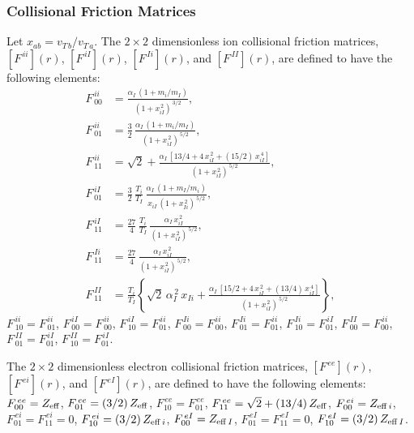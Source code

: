 \documentclass[12pt,prb,aps]{revtex4-1}
\begin{document}
\subsubsection{Collisional Friction Matrices}
Let $x_{ab}=v_{T\,b}/v_{T\,a}$. The  $2\times 2$ dimensionless ion collisional friction matrices, $[F^{\,ii}](r)$, $[F^{\,iI}](r)$, $[F^{\,Ii}](r)$, and $[F^{\,II}](r)$, are defined to have the following elements:\,\cite{sigmar}
\begin{align}
F^{\,ii}_{\,00} &= \frac{\alpha_I\,(1+m_i/m_I)}{(1+x_{iI}^{\,2})^{\,3/2}},\\[0.5ex]
F^{\,ii}_{\,01}&=\frac{3}{2}\,\frac{\alpha_I\,(1+m_i/m_I)}{(1+x_{iI}^{\,2})^{\,5/2}},\\[0.5ex]
F^{\,ii}_{\,11}& =\sqrt{2}+ \frac{\alpha_I\,[13/4+4\,x_{iI}^{\,2}+(15/2)\,x_{iI}^{\,4}]}{(1+x_{iI}^{\,2})^{\,5/2}},\\[0.5ex]
F^{\,iI}_{\,01}&=\frac{3}{2}\,\frac{T_i}{T_I}\,\frac{\alpha_I\,(1+m_I/m_i)}{x_{iI}\,(1+x_{Ii}^{\,2})^{\,5/2}},\\[0.5ex]
F^{\,iI}_{\,11}& =\frac{27}{4}\,\frac{T_i}{T_I}\,\frac{\alpha_I\,x_{iI}^{\,2}}{(1+x_{iI}^{\,2})^{\,5/2}},\\[0.5ex]
F^{\,Ii}_{\,11}& =\frac{27}{4}\,\frac{\alpha_I\,x_{iI}^{\,2}}{(1+x_{iI}^{\,2})^{\,5/2}},\\[0.5ex]
F^{\,II}_{\,11}& =\frac{T_i}{T_I}\left\{\sqrt{2}\,\alpha_I^{\,2}\,x_{Ii} + \frac{\alpha_I\,[
15/2+4\,x_{iI}^{\,2}+(13/4)\,x_{iI}^{\,4}]}{(1+x_{iI}^{\,2})^{\,5/2}}\right\},
\end{align}
 $F^{\,ii}_{\,10}=F^{\,ii}_{\,01}$, $F^{\,iI}_{\,00} =F^{\,ii}_{\,00}$, $F^{\,iI}_{\,10}=F^{\,ii}_{01}$, $F^{\,Ii}_{\,00} =F^{\,ii}_{\,00}$,
$F^{\,Ii}_{\,01}=F^{\,ii}_{01}$, 
$F^{\,Ii}_{\,10}=F^{\,iI}_{01}$, $F^{\,II}_{\,00} =F^{\,ii}_{00}$,
$F^{\,II}_{\,01}=F^{\,iI}_{01}$, 
$F^{\,II}_{\,10}=F^{\,iI}_{01}$.

The $2\times 2$ dimensionless electron collisional friction matrices, $[F^{\,ee}](r)$,   $[F^{\,ei}](r)$, and
$[F^{\,eI}](r)$, are defined to have the following elements:\,\cite{sigmar}
$F^{\,ee}_{00} = Z_{\rm eff}$,
$F^{\,ee}_{01} = (3/2)\,Z_{\rm eff}$,
$F^{\,ee}_{10} = F^{\,ee}_{01}$,
$F^{\,ee}_{11}= \sqrt{2} + (13/4)\,Z_{\rm eff}$, $F^{\,ei}_{00} = Z_{{\rm eff}\,i}$,
$F^{\,ei}_{01} =F^{\,ei}_{11}=0$, $F^{\,ei}_{10}=(3/2)\,Z_{{\rm eff}\,i}$,  $F^{\,eI}_{00} = Z_{{\rm eff}\,I}$,
$F^{\,eI}_{01} =F^{\,eI}_{11}=0$, $F^{\,eI}_{10}=(3/2)\,Z_{{\rm eff}\,I}$. 
\end{document}
